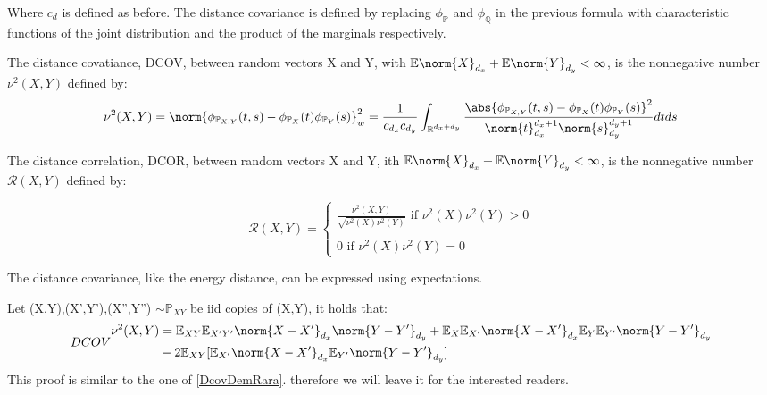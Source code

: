 Where $c_{d}$ is defined as before.
The distance covariance is defined by replacing $\phi_{\mathbb{P}}$ and $\phi_{\mathbb{Q}}$ in the previous formula with characteristic functions of the joint distribution and the product of the marginals respectively.
\begin{defn}
The distance covatiance, DCOV, between random vectors X and Y, with $\mathbb{E}\norm{X}_{d_{x}} + \mathbb{E}\norm{Y}_{d_{y}} < \infty$, is the nonnegative number $\nu^{2}(X,Y)$ defined by:
\vspace{5mm}
$$
\nu^{2}(X,Y) = \norm{\phi_{\mathbb{P}_{X,Y}}(t,s)-\phi_{\mathbb{P}_{X}}(t)\phi_{\mathbb{P}_{Y}}(s)}^{2}_{w} = \frac{1}{c_{d_{x}}c_{d_{y}}}\int_{\mathbb{R}^{d_{x} + d_{y}}}\frac{\abs{\phi_{\mathbb{P}_{X,Y}}(t,s)-\phi_{\mathbb{P}_{X}}(t)\phi_{\mathbb{P}_{Y}}(s)}^{2}}{\norm{t}^{d_{x}+1}_{d_{x}}\norm{s}^{d_{y}+1}_{d_{y}}} dtds
$$
\end{defn}
\begin{defn}
The distance correlation, DCOR, between random vectors X and Y, ith $\mathbb{E}\norm{X}_{d_{x}} + \mathbb{E}\norm{Y}_{d_{y}} < \infty$, is the nonnegative number $\mathcal{R}(X,Y)$ defined by:

$$
\mathcal{R}(X,Y) = \left \{
	\begin{array}{c} 
		\frac{\nu^{2}(X,Y)}{\sqrt{\nu^{2}(X)\nu^{2}(Y)}} \text{ if } \nu^{2}(X)\nu^{2}(Y) > 0 \\ 
		\\
		0 \text{ if } \nu^{2}(X)\nu^{2}(Y) = 0 
	\end{array}
	\right.  
$$
\end{defn}
The distance covariance, like the energy distance, can be expressed using expectations.
\begin{lem}
Let (X,Y),(X',Y'),(X'',Y'') $\sim \mathbb{P}_{XY}$ be iid copies of (X,Y), it holds that:
\begin{equation}{DCOV}
\begin{split}
\nu^{2}(X,Y)  
&= \mathbb{E}_{XY}\mathbb{E}_{X'Y'}\norm{X-X'}_{d_{x}}\norm{Y-Y'}_{d_{y}} + \mathbb{E}_{X}\mathbb{E}_{X'}\norm{X-X'}_{d_{x}}\mathbb{E}_{Y}\mathbb{E}_{Y'}\norm{Y-Y'}_{d_{y}} \\
&-2\mathbb{E}_{XY}[\mathbb{E}_{X'}\norm{X-X'}_{d_{x}}\mathbb{E}_{Y'}\norm{Y-Y'}_{d_{y}}]
\end{split}
\end{equation} 
This proof is similar to the one of \ref{DcovDemRara}. therefore we will leave it for the interested readers.
\end{lem}


